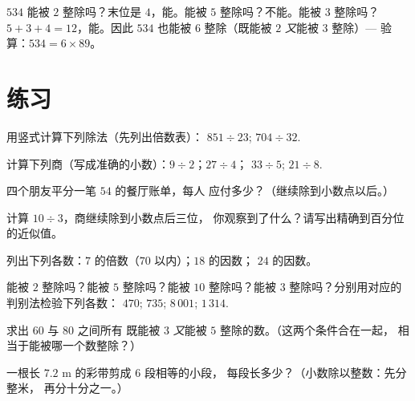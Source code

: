 \begin{example}\label{ex:g5:division:criteria}
$534$ 能被 $2$ 整除吗？末位是 $4$，能。能被 $5$ 整除吗？不能。能被 $3$ 整除吗？
$5 + 3 + 4 = 12$，能。因此 $534$ 也能被 $6$ 整除（既能被 $2$
\emph{又}能被 $3$ 整除）--- 验算：$534 = 6 \times 89$。
\end{example}

\section{练习}

\begin{exercise}[$\star$]\label{exo:g5:division:1}
用竖式计算下列除法（先列出倍数表）：
$851 \div 23$; \quad $704 \div 32$.
\end{exercise}

\begin{exercise}[$\star$]\label{exo:g5:division:2}
计算下列商（写成准确的小数）：$9 \div 2$；\quad $27 \div 4$；
\quad $33 \div 5$; \quad $21 \div 8$.
\end{exercise}

\begin{exercise}[$\star$]\label{exo:g5:division:3}
四个朋友平分一笔 $54$ 的餐厅账单，每人
应付多少？（继续除到小数点以后。）
\end{exercise}

\begin{exercise}[$\star$]\label{exo:g5:division:4}
计算 $10 \div 3$，商继续除到小数点后三位，
你观察到了什么？请写出精确到百分位的近似值。
\end{exercise}

\begin{exercise}[$\star$]\label{exo:g5:division:5}
列出下列各数：$7$ 的倍数（$70$ 以内）；$18$ 的因数；
$24$ 的因数。
\end{exercise}

\begin{exercise}[$\star$]\label{exo:g5:division:6}
能被 $2$ 整除吗？能被 $5$ 整除吗？能被 $10$ 整除吗？能被 $3$ 整除吗？分别用对应的判别法检验下列各数：
$470$; \quad $735$; \quad $8\,001$; \quad $1\,314$.
\end{exercise}

\begin{exercise}[$\star$]\label{exo:g5:division:7}
求出 $60$ 与 $80$ 之间所有
既能被 $3$ \emph{又}能被 $5$ 整除的数。（这两个条件合在一起，
相当于能被哪一个数整除？）
\end{exercise}

\begin{exercise}[$\star$]\label{exo:g5:division:8}
一根长 $7.2$ m 的彩带剪成 $6$ 段相等的小段，
每段长多少？（小数除以整数：先分整米，
再分十分之一。）
\end{exercise}

